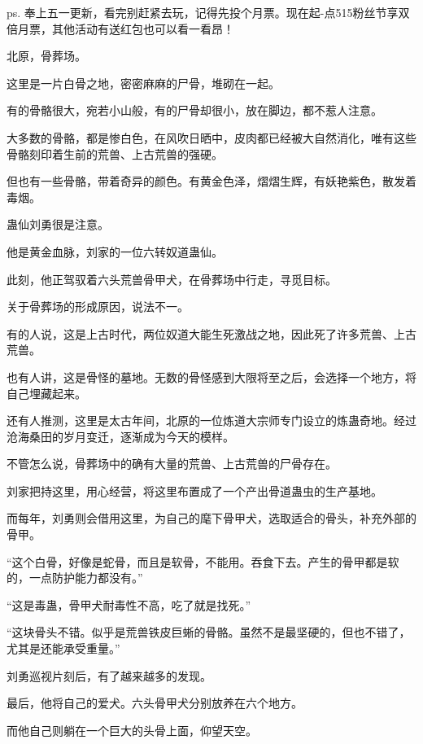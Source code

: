 
\begin{this_body}

ps. 奉上五一更新，看完别赶紧去玩，记得先投个月票。现在起-点515粉丝节享双倍月票，其他活动有送红包也可以看一看昂！

北原，骨葬场。

这里是一片白骨之地，密密麻麻的尸骨，堆砌在一起。

有的骨骼很大，宛若小山般，有的尸骨却很小，放在脚边，都不惹人注意。

大多数的骨骼，都是惨白色，在风吹日晒中，皮肉都已经被大自然消化，唯有这些骨骼刻印着生前的荒兽、上古荒兽的强硬。

但也有一些骨骼，带着奇异的颜色。有黄金色泽，熠熠生辉，有妖艳紫色，散发着毒烟。

蛊仙刘勇很是注意。

他是黄金血脉，刘家的一位六转奴道蛊仙。

此刻，他正驾驭着六头荒兽骨甲犬，在骨葬场中行走，寻觅目标。

关于骨葬场的形成原因，说法不一。

有的人说，这是上古时代，两位奴道大能生死激战之地，因此死了许多荒兽、上古荒兽。

也有人讲，这是骨怪的墓地。无数的骨怪感到大限将至之后，会选择一个地方，将自己埋藏起来。

还有人推测，这里是太古年间，北原的一位炼道大宗师专门设立的炼蛊奇地。经过沧海桑田的岁月变迁，逐渐成为今天的模样。

不管怎么说，骨葬场中的确有大量的荒兽、上古荒兽的尸骨存在。

刘家把持这里，用心经营，将这里布置成了一个产出骨道蛊虫的生产基地。

而每年，刘勇则会借用这里，为自己的麾下骨甲犬，选取适合的骨头，补充外部的骨甲。

“这个白骨，好像是蛇骨，而且是软骨，不能用。吞食下去。产生的骨甲都是软的，一点防护能力都没有。”

“这是毒蛊，骨甲犬耐毒性不高，吃了就是找死。”

“这块骨头不错。似乎是荒兽铁皮巨蜥的骨骼。虽然不是最坚硬的，但也不错了，尤其是还能承受重量。”

刘勇巡视片刻后，有了越来越多的发现。

最后，他将自己的爱犬。六头骨甲犬分别放养在六个地方。

而他自己则躺在一个巨大的头骨上面，仰望天空。


\end{this_body}
